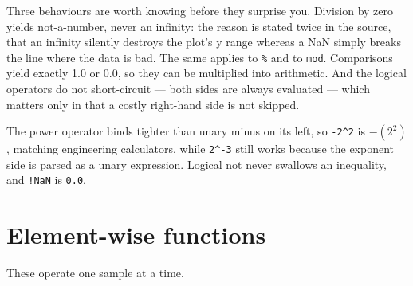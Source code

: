 \documentclass[11pt,a4paper,oneside]{report}
\newcommand{\code}[1]{\texttt{#1}}
\begin{document}
Three behaviours are worth knowing before they surprise you. Division by zero
yields not-a-number, never an infinity: the reason is stated twice in the source,
that an infinity silently destroys the plot's y range whereas a NaN simply breaks
the line where the data is bad. The same applies to \code{\%} and to \code{mod}.
Comparisons yield exactly 1.0 or 0.0, so they can be multiplied into arithmetic.
And the logical operators do not short-circuit --- both sides are always
evaluated --- which matters only in that a costly right-hand side is not skipped.

The power operator binds tighter than unary minus on its left, so
\code{-2\textasciicircum2} is $-(2^2)$, matching engineering calculators, while
\code{2\textasciicircum-3} still works because the exponent side is parsed as a
unary expression. Logical not never swallows an inequality, and \code{!NaN} is
\code{0.0}.

\section{Element-wise functions}

These operate one sample at a time.
\end{document}
